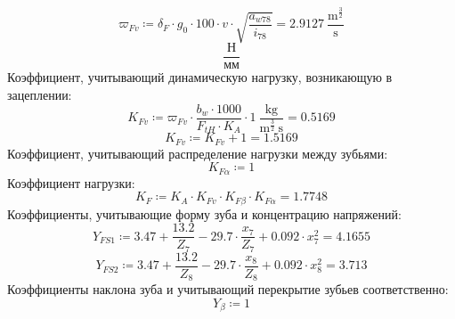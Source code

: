 \documentclass{article}
\newcommand{\defeq}{\coloneq} %
\begin{document}
\begin{equation*}
ϖ_{Fv} \defeq δ_{F} \cdot \textit{g}_{\textit{0}} \cdot 100 \cdot v \cdot \sqrt{\frac{\textit{a}_{\textit{w78}}}{\textit{i}_{\textit{78}}}} = {2.9127 \: \frac{\mathrm{m}^{\frac{3}{2}}}{\mathrm{s}}}
\end{equation*}
\begin{equation*}
\frac{Н}{мм}
\end{equation*}
\colorbox[HTML]{000000}{Коэффициент, учитывающий динамическую нагрузку, возникающую в зацеплении:}\newline
\begin{equation*}
K_{Fv} \defeq ϖ_{Fv} \cdot \frac{b_{w} \cdot 1000}{F_{tH} \cdot K_{A}} \cdot 1 \: \frac{\mathrm{kg}}{\mathrm{m}^{\frac{3}{2}} \: \mathrm{s}} = {0.5169}
\end{equation*}
\begin{equation*}
K_{Fv} \defeq K_{Fv}+1 = {1.5169}
\end{equation*}
\colorbox[HTML]{000000}{Коэффициент, учитывающий распределение нагрузки между зубьями:}\newline
\begin{equation*}
K_{Fα} \defeq 1
\end{equation*}
\colorbox[HTML]{000000}{Коэффициент нагрузки:}\newline
\begin{equation*}
K_{F} \defeq K_{A} \cdot K_{Fv} \cdot K_{Fβ} \cdot K_{Fα} = {1.7748}
\end{equation*}
\colorbox[HTML]{000000}{Коэффициенты, учитывающие форму зуба и концентрацию напряжений:}\newline
\begin{equation*}
\textit{Y}_{\textit{FS1}} \defeq 3.47+\frac{13.2}{\textit{Z}_{\textit{7}}}-29.7 \cdot \frac{\textit{x}_{\textit{7}}}{\textit{Z}_{\textit{7}}}+0.092 \cdot \textit{x}_{\textit{7}}^{2} = {4.1655}
\end{equation*}
\begin{equation*}
\textit{Y}_{\textit{FS2}} \defeq 3.47+\frac{13.2}{\textit{Z}_{\textit{8}}}-29.7 \cdot \frac{\textit{x}_{\textit{8}}}{\textit{Z}_{\textit{8}}}+0.092 \cdot \textit{x}_{\textit{8}}^{2} = {3.713}
\end{equation*}
\colorbox[HTML]{000000}{Коэффициенты наклона зуба и учитывающий перекрытие зубьев соответственно:}\newline
\begin{equation*}
Y_{β} \defeq 1
\end{equation*}
\end{document}
